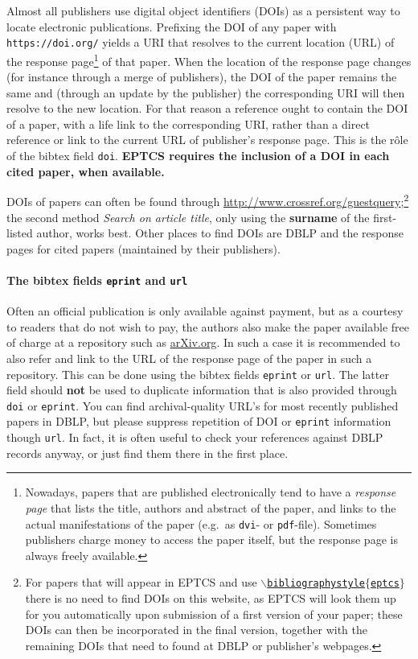 \documentclass[submission,copyright,creativecommons]{eptcs}
\begin{document}
Almost all publishers use digital object identifiers (DOIs) as a
persistent way to locate electronic publications. Prefixing the DOI of
any paper with {\tt https://doi.org/} yields a URI that resolves to the
current location (URL) of the response page\footnote{Nowadays, papers
  that are published electronically tend
  to have a \emph{response page} that lists the title, authors and
  abstract of the paper, and links to the actual manifestations of
  the paper (e.g.\ as {\tt dvi}- or {\tt pdf}-file). Sometimes
  publishers charge money to access the paper itself, but the response
  page is always freely available.}
of that paper. When the location of the response page changes (for
instance through a merge of publishers), the DOI of the paper remains
the same and (through an update by the publisher) the corresponding
URI will then resolve to the new location. For that reason a reference
ought to contain the DOI of a paper, with a life link to the corresponding
URI, rather than a direct reference or link to the current URL of
publisher's response page. This is the r\^ole of the bibtex field {\tt doi}.
{\bf EPTCS requires the inclusion of a DOI in each cited paper, when available.}

DOIs of papers can often be found through
\url{http://www.crossref.org/guestquery};\footnote{For papers that will appear
  in EPTCS and use \href{http://eptcs.web.cse.unsw.edu.au/eptcs.bst}
  {\tt $\backslash$bibliographystyle$\{$eptcs$\}$} there is no need to
  find DOIs on this website, as EPTCS will look them up for you
  automatically upon submission of a first version of your paper;
  these DOIs can then be incorporated in the final version, together
  with the remaining DOIs that need to found at DBLP or publisher's webpages.}
the second method {\it Search on article title}, only using the {\bf
surname} of the first-listed author, works best.
Other places to find DOIs are DBLP and the response pages for cited
papers (maintained by their publishers).

\paragraph{The bibtex fields {\tt eprint} and {\tt url}}

Often an official publication is only available against payment, but
as a courtesy to readers that do not wish to pay, the authors also
make the paper available free of charge at a repository such as
\url{arXiv.org}. In such a case it is recommended to also refer and
link to the URL of the response page of the paper in such a
repository.  This can be done using the bibtex fields {\tt eprint}
or {\tt url}.  The latter field should \textbf{not} be used
to duplicate information that is also provided through {\tt doi} or {\tt eprint}.
You can find archival-quality URL's for most recently published papers
in DBLP, but please suppress repetition of DOI or {\tt eprint} information though {\tt url}.
In fact, it is often useful to check your references against DBLP records anyway,
or just find them there in the first place.
\end{document}
